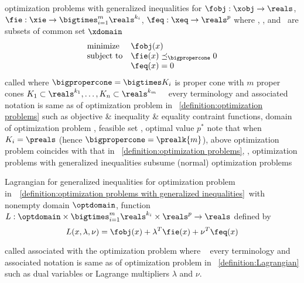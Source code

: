 \documentclass[17pt,landscape]{foils}
\begin{document}
{\begin{mydefinition}{optimization problems with generalized inequalities}
	for $\fobj:\xobj \to \reals$, $\fie: \xie\to \bigtimes_{i=1}^m \reals^{k_i} $, $\feq: \xeq \to \reals^p$
	where \xobj, \xie, and \xeq\ are subsets of common set $\xdomain$
	$$
		\begin{array}{ll}
			\mbox{minimize}
				& \fobj(x)
			\\
			\mbox{subject to}
				& \fie(x) \preceq_\bigpropercone 0
			\\
				& \feq(x) =0
		\end{array}
	$$
	called 
	where
	$\bigpropercone = \bigtimes K_i$ is proper cone
	with
	$m$ proper cones
	$K_1\subset \reals^{k_1},\ldots, K_n\subset \reals^{k_m}$\
	\shrinkspacewithintheoremslike\
	\ibit
	\iitem
		every terminology and associated notation is same
		as of optimization problem in ~\ref{definition:optimization problems}
		such as
		objective \& inequality \& equality contraint functions,
		{domain} of optimization problem \optdomain,
		feasible set \optfeasset,
		optimal value $p^\ast$
	\iitem
		note that
		when $K_i=\preals$ (hence $\bigpropercone=\prealk{m}$),
		above optimization problem coincides with that in ~\ref{definition:optimization problems},
		\ie,
		{optimization problems with generalized inequalities}
		{subsume}
		{(normal) optimization problems}
	\eit
\end{mydefinition}



\begin{mydefinition}{Lagrangian for generalized inequalities}
	for optimization problem in\
	~\ref{definition:optimization problems with generalized inequalities}\
	with nonempty domain $\optdomain$,
	function $L:\optdomain \times \bigtimes_{i=1}^m \reals^{k_i} \times \reals^p \to \reals$
	defined by
	$$
		L(x,\lambda, \nu) = \fobj(x) + \lambda^T \fie(x) + \nu^T \feq(x)
	$$

	called \define{Lagrangian} associated with the optimization problem
	where
	\shrinkspacewithintheoremslike\
	\ibit
%
	\iitem
		every terminology and associated notation is same
		as of optimization problem in ~\ref{definition:Lagrangian}
		such as
		dual variables or Lagrange multipliers $\lambda$ and $\nu$.
%


\end{mydefinition}}
\end{document}
